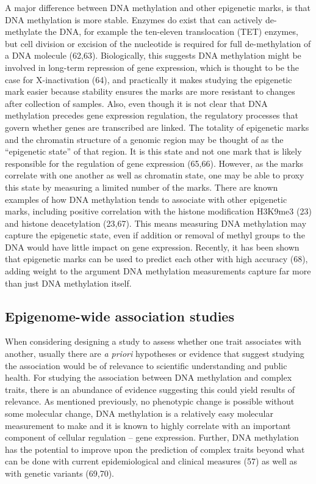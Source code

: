 \documentclass[11pt,twoside]{bristolthesis}
\begin{document}
A major difference between DNA methylation and other epigenetic marks, is that DNA methylation is more stable. Enzymes do exist that can actively de-methylate the DNA, for example the ten-eleven translocation (TET) enzymes, but cell division or excision of the nucleotide is required for full de-methylation of a DNA molecule (62,63). Biologically, this suggests DNA methylation might be involved in long-term repression of gene expression, which is thought to be the case for X-inactivation (64), and practically it makes studying the epigenetic mark easier because stability ensures the marks are more resistant to changes after collection of samples. Also, even though it is not clear that DNA methylation precedes gene expression regulation, the regulatory processes that govern whether genes are transcribed are linked. The totality of epigenetic marks and the chromatin structure of a genomic region may be thought of as the ``epigenetic state'' of that region. It is this state and not one mark that is likely responsible for the regulation of gene expression (65,66). However, as the marks correlate with one another as well as chromatin state, one may be able to proxy this state by measuring a limited number of the marks. There are known examples of how DNA methylation tends to associate with other epigenetic marks, including positive correlation with the histone modification H3K9me3 (23) and histone deacetylation (23,67). This means measuring DNA methylation may capture the epigenetic state, even if addition or removal of methyl groups to the DNA would have little impact on gene expression. Recently, it has been shown that epigenetic marks can be used to predict each other with high accuracy (68), adding weight to the argument DNA methylation measurements capture far more than just DNA methylation itself.

\hypertarget{ewas}{%
\subsection{Epigenome-wide association studies}\label{ewas}}

When considering designing a study to assess whether one trait associates with another, usually there are \emph{a priori} hypotheses or evidence that suggest studying the association would be of relevance to scientific understanding and public health. For studying the association between DNA methylation and complex traits, there is an abundance of evidence suggesting this could yield results of relevance. As mentioned previously, no phenotypic change is possible without some molecular change, DNA methylation is a relatively easy molecular measurement to make and it is known to highly correlate with an important component of cellular regulation -- gene expression. Further, DNA methylation has the potential to improve upon the prediction of complex traits beyond what can be done with current epidemiological and clinical measures (57) as well as with genetic variants (69,70).
\end{document}
